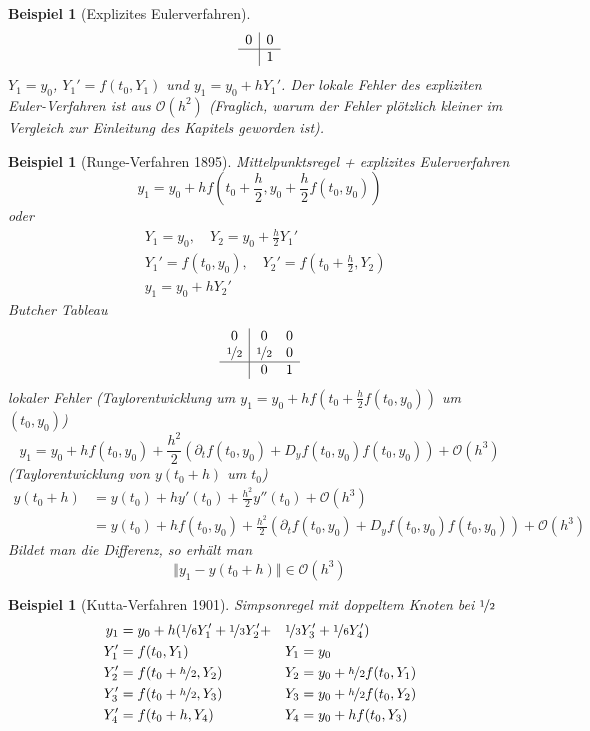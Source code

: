 \documentclass[12pt]{article}
\theoremstyle{break}
\newtheorem{example}[theorem]{Beispiel}
\begin{document}
\begin{example}[Explizites Eulerverfahren]
$$\begin{array}{c|c} 0 & 0 \\ \hline & 1 \end{array}$$
$Y_1 = y_0$, $Y_1' = f(t_0, Y_1)$ und $y_1 = y_0 + hY_1'$. Der lokale Fehler des expliziten Euler-Verfahren ist aus $\mathcal{O}(h^2)$ (Fraglich, warum der Fehler plötzlich kleiner im Vergleich zur Einleitung des Kapitels geworden ist).
\end{example}

\begin{example}[Runge-Verfahren 1895]
Mittelpunktsregel + explizites Eulerverfahren
$$y_1 = y_0 + hf(t_0 + \frac{h}{2}, y_0 + \frac{h}{2}f(t_0, y_0))$$
oder
\begin{align*}
&Y_1 = y_0, \quad Y_2 = y_0 + \frac{h}{2}Y_1' \\
&Y_1' = f(t_0, y_0), \quad Y_2' = f(t_0 + \frac{h}{2}, Y_2) \\
&y_1 = y_0 + hY_2'
\end{align*}
Butcher Tableau
$$\begin{array}{c|cc} 0 & 0 & 0 \\ \nicefrac{1}{2} & \nicefrac{1}{2} & 0 \\ \hline & 0 & 1\end{array}$$
lokaler Fehler (Taylorentwicklung um $y_1 = y_0 + hf(t_0 + \frac{h}{2} f(t_0, y_0))$ um $(t_0, y_0)$)
$$y_1 = y_0 + hf(t_0, y_0) + \frac{h^2}{2}( \partial_t f(t_0, y_0) + D_y f(t_0, y_0) f(t_0,y_0)) + \mathcal{O}(h^3)$$
(Taylorentwicklung von $y(t_0 + h)$ um $t_0$)
\begin{align*}
y(t_0 + h) &= y(t_0) + hy'(t_0) + \frac{h^2}{2} y''(t_0) + \mathcal{O}(h^3) &\\
&= y(t_0) + hf(t_0, y_0) + \frac{h^2}{2} \left( \partial_tf(t_0, y_0) + D_y f(t_0,y_0)f(t_0,y_0) \right) + \mathcal{O}(h^3)
\end{align*}
Bildet man die Differenz, so erhält man
$$ \Vert y_1 - y(t_0 + h) \Vert \in \mathcal{O}(h^3)$$
\end{example}

\begin{example}[Kutta-Verfahren 1901]
Simpsonregel mit doppeltem Knoten bei $\nicefrac{1}{2}$
\begin{alignat*}{3}
y_1 &= y_0 + h( \nicefrac{1}{6}Y_1' + \nicefrac{1}{3}Y_2' + &&\nicefrac{1}{3}Y_3' + \nicefrac{1}{6}Y_4' ) \\
Y_1' &= f(t_0, Y_1) \quad  &&Y_1 = y_0 \\
Y_2' &= f(t_0 + \nicefrac{h}{2} , Y_2) \quad  &&Y_2 = y_0 + \nicefrac{h}{2} f(t_0, Y_1)\\
Y_3' &= f(t_0 + \nicefrac{h}{2} , Y_3) \quad  &&Y_3 = y_0 + \nicefrac{h}{2} f(t_0, Y_2)\\
Y_4' &= f(t_0 + h , Y_4) \quad  &&Y_4 = y_0 + h f(t_0, Y_3)\\
\end{alignat*}
\end{example}
\end{document}
